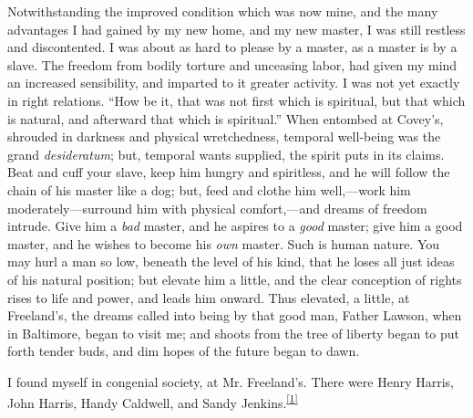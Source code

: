 Notwithstanding the improved condition which was now mine, and the many
advantages I had gained by my new home, and my new master, I was still
restless and discontented. I was about as hard to please by a master, as
a master is by a slave. The freedom from bodily torture and unceasing
labor, had given my mind an increased sensibility, and imparted to it
greater activity. I was not yet exactly in right relations. ``How be it,
that was not first which is spiritual, but that which is natural, and
afterward that which is spiritual.'' When entombed at Covey's, shrouded
in darkness and physical wretchedness, temporal well-being was the grand
\emph{desideratum}; but, temporal wants supplied, the spirit puts in its
claims. Beat and cuff your slave, keep him hungry and spiritless, and he
will follow the chain of his master like a dog; but, feed and clothe him
well,---work him moderately---surround him with physical comfort,---and
dreams of freedom intrude. Give him a \emph{bad} master, and he aspires
to a \emph{good} master; give him a good master, and he wishes to become
his \emph{own} master. Such is human nature. You may hurl a man so low,
beneath the level of his kind, that he loses all just ideas of his
natural position; but elevate him a little, and {}the clear conception
of rights rises to life and power, and leads him onward. Thus elevated,
a little, at Freeland's, the dreams called into being by that good man,
Father Lawson, when in Baltimore, began to visit me; and shoots from the
tree of liberty began to put forth tender buds, and dim hopes of the
future began to dawn.

I found myself in congenial society, at Mr. Freeland's. There were Henry
Harris, John Harris, Handy Caldwell, and Sandy
Jenkins.\textsuperscript{\protect\hyperlink{cite_note-1}{{[}1{]}}}

